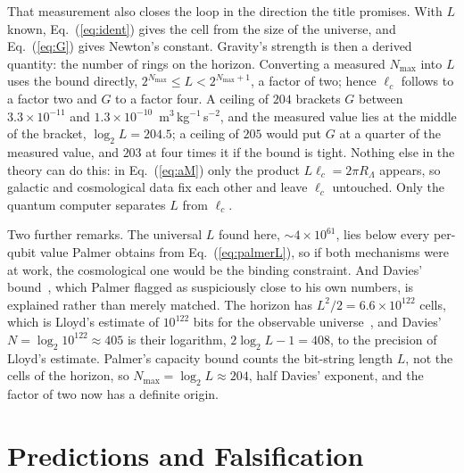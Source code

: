 \documentclass[aps,prd,twocolumn,superscriptaddress,nofootinbib,showkeys]{revtex4-2}
\newcommand{\lc}{\ell_c}
\newcommand{\RL}{R_\Lambda}
\begin{document}
That measurement also closes the loop in the direction the title promises. With $L$ known, Eq.~(\ref{eq:ident}) gives the cell from the size of the universe, and Eq.~(\ref{eq:G}) gives Newton's constant. Gravity's strength is then a derived quantity: the number of rings on the horizon. Converting a measured $N_{\max}$ into $L$ uses the bound directly, $2^{N_{\max}}\le L<2^{N_{\max}+1}$, a factor of two; hence $\lc$ follows to a factor two and $G$ to a factor four. A ceiling of $204$ brackets $G$ between $3.3\times10^{-11}$ and $1.3\times10^{-10}$~m$^3$\,kg$^{-1}$\,s$^{-2}$, and the measured value lies at the middle of the bracket, $\log_2 L = 204.5$; a ceiling of $205$ would put $G$ at a quarter of the measured value, and $203$ at four times it if the bound is tight. Nothing else in the theory can do this: in Eq.~(\ref{eq:aM}) only the product $L\lc = 2\pi\RL$ appears, so galactic and cosmological data fix each other and leave $\lc$ untouched. Only the quantum computer separates $L$ from $\lc$.

Two further remarks. The universal $L$ found here, $\sim4\times10^{61}$, lies below every per-qubit value Palmer obtains from Eq.~(\ref{eq:palmerL}), so if both mechanisms were at work, the cosmological one would be the binding constraint. And Davies' bound~\cite{davies2007}, which Palmer flagged as suspiciously close to his own numbers, is explained rather than merely matched. The horizon has $L^2/2 = 6.6\times10^{122}$ cells, which is Lloyd's estimate of $10^{122}$ bits for the observable universe~\cite{lloyd2002}, and Davies' $N = \log_2 10^{122}\approx405$ is their logarithm, $2\log_2L - 1 = 408$, to the precision of Lloyd's estimate. Palmer's capacity bound counts the bit-string length $L$, not the cells of the horizon, so $N_{\max} = \log_2 L\approx204$, half Davies' exponent, and the factor of two now has a definite origin.

\section{Predictions and Falsification}
\label{sec:predictions}
\end{document}
